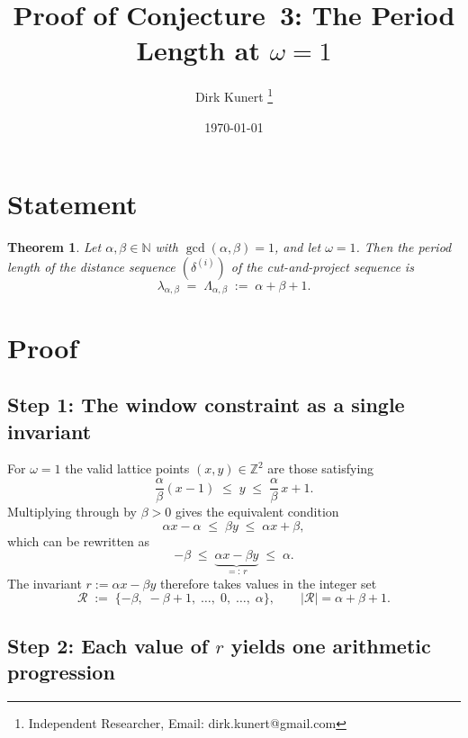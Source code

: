 \documentclass[11pt]{article}
\title{Proof of Conjecture~3: The Period Length at $\omega = 1$}
\author{Dirk Kunert \thanks{Independent Researcher, Email: dirk.kunert@gmail.com}}
\date{\today}
\theoremstyle{plain}
\newtheorem{theorem}{Theorem}
\theoremstyle{remark}
\begin{document}
\maketitle

\section*{Statement}

\begin{theorem}
Let $\alpha, \beta \in \mathbb{N}$ with $\gcd(\alpha, \beta) = 1$, and let $\omega = 1$.
Then the period length of the distance sequence $\left(\delta^{(i)}\right)$ of the
cut-and-project sequence is
\[
    \lambda_{\alpha,\beta} \;=\; \Lambda_{\alpha,\beta} \;:=\; \alpha + \beta + 1.
\]
\end{theorem}

\section*{Proof}

\subsection*{Step 1: The window constraint as a single invariant}

For $\omega = 1$ the valid lattice points $(x, y) \in \mathbb{Z}^2$ are those satisfying
\[
    \frac{\alpha}{\beta}(x - 1) \;\le\; y \;\le\; \frac{\alpha}{\beta}\,x + 1.
\]
Multiplying through by $\beta > 0$ gives the equivalent condition
\[
    \alpha x - \alpha \;\le\; \beta y \;\le\; \alpha x + \beta,
\]
which can be rewritten as
\[
    -\beta \;\le\; \underbrace{\alpha x - \beta y}_{=:\,r} \;\le\; \alpha.
\]
The invariant $r := \alpha x - \beta y$ therefore takes values in the integer set
\[
    \mathcal{R} \;:=\; \{-\beta,\; -\beta+1,\; \ldots,\; 0,\; \ldots,\; \alpha\},
    \qquad |\mathcal{R}| = \alpha + \beta + 1.
\]

\subsection*{Step 2: Each value of $r$ yields one arithmetic progression}
\end{document}
